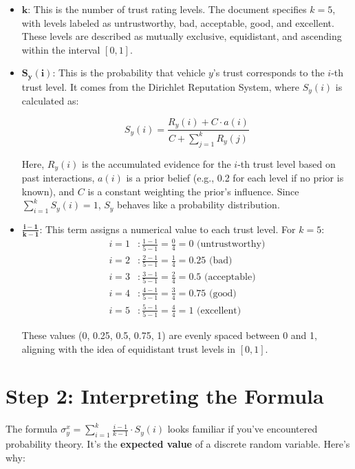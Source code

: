 \documentclass{article}
\begin{document}
\begin{itemize}
    \item \(\mathbf{k}\): This is the number of trust rating levels. The document specifies \(k = 5\), with levels labeled as untrustworthy, bad, acceptable, good, and excellent. These levels are described as mutually exclusive, equidistant, and ascending within the interval \([0, 1]\).

    \item \(\mathbf{S_y(i)}\): This is the probability that vehicle \(y\)’s trust corresponds to the \(i\)-th trust level. It comes from the Dirichlet Reputation System, where \(S_y(i)\) is calculated as:

    \[
    S_y(i) = \frac{R_y(i) + C \cdot a(i)}{C + \sum_{j=1}^k R_y(j)}
    \]

    Here, \(R_y(i)\) is the accumulated evidence for the \(i\)-th trust level based on past interactions, \(a(i)\) is a prior belief (e.g., 0.2 for each level if no prior is known), and \(C\) is a constant weighting the prior’s influence. Since \(\sum_{i=1}^k S_y(i) = 1\), \(S_y\) behaves like a probability distribution.

    \item \(\mathbf{\frac{i-1}{k-1}}\): This term assigns a numerical value to each trust level. For \(k = 5\):
    \begin{align*}
        i = 1&: \frac{1-1}{5-1} = \frac{0}{4} = 0 \text{ (untrustworthy)} \\
        i = 2&: \frac{2-1}{5-1} = \frac{1}{4} = 0.25 \text{ (bad)} \\
        i = 3&: \frac{3-1}{5-1} = \frac{2}{4} = 0.5 \text{ (acceptable)} \\
        i = 4&: \frac{4-1}{5-1} = \frac{3}{4} = 0.75 \text{ (good)} \\
        i = 5&: \frac{5-1}{5-1} = \frac{4}{4} = 1 \text{ (excellent)}
    \end{align*}

    These values (0, 0.25, 0.5, 0.75, 1) are evenly spaced between 0 and 1, aligning with the idea of equidistant trust levels in \([0, 1]\).
\end{itemize}

\section*{Step 2: Interpreting the Formula}
The formula \(\sigma_y^x = \sum_{i=1}^k \frac{i-1}{k-1} \cdot S_y(i)\) looks familiar if you’ve encountered probability theory. It’s the \textbf{expected value} of a discrete random variable. Here’s why:
\end{document}
